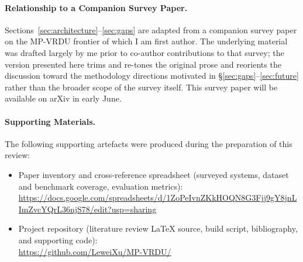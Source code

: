 \documentclass[11pt]{article}
\begin{document}
\paragraph{Relationship to a Companion Survey Paper.}
Sections~\ref{sec:architecture}--\ref{sec:gaps} are adapted from a companion survey paper on the MP-VRDU frontier of which I am first author. The underlying material was drafted largely by me prior to co-author contributions to that survey; the version presented here trims and re-tones the original prose and reorients the discussion toward the methodology directions motivated in \S\ref{sec:gaps}--\ref{sec:future} rather than the broader scope of the survey itself. This survey paper will be available on arXiv in early June.

\paragraph{Supporting Materials.}
The following supporting artefacts were produced during the preparation of this review:
\begin{itemize}
  \item Paper inventory and cross-reference spreadsheet (surveyed systems, dataset and benchmark coverage, evaluation metrics): \\ \url{https://docs.google.com/spreadsheets/d/1ZoPeIvnZKkHOQN8G3Fjj9gY8jnLImZvcYQrL36njS78/edit?usp=sharing}
  \item Project repository (literature review \LaTeX{} source, build script, bibliography, and supporting code): \\ \url{https://github.com/LeweiXu/MP-VRDU/}
\end{itemize}







\appendix
\end{document}
